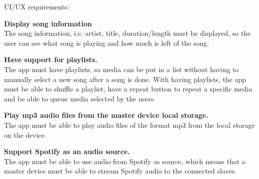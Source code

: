 UI/UX requirements:
\begin{eletterate}[resume]
    \item \textbf{Display song information} \hfill\\
        The song information, i.e. artist, title, duration/length must be displayed,
        so the user can see what song is playing and how much is left of the song.

    \item \textbf{Have support for playlists.} \hfill\\
        The app must have playlists, so media can be put in a list without having to manually select a new song after a song is done.
        With having playlists, the app must be able to shuffle a playlist, 
        have a repeat button to repeat a specific media and be able to queue media selected by the users.

    \item \textbf{Play mp3 audio files from the master device local storage.} \hfill\\
        The app must be able to play audio files of the format mp3 from the local storage on the device.

    \item \textbf{Support Spotify as an audio source.} \hfill\\
        The app must be able to use audio from Spotify as source,
        which means that a master device must be able to stream Spotify audio to the connected slaves.
\end{eletterate}
